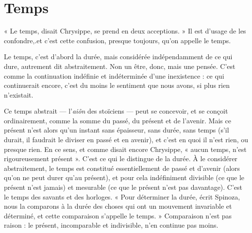 \section{Temps}
« Le temps, disait Chrysippe, se prend en deux acceptions. » Il est
d’usage de les confondre,.et c’est cette confusion, presque toujours,
qu’on appelle le temps.

Le temps, c’est d’abord la durée, mais considérée indépendamment de ce
qui dure, autrement dit abstraitement. Non un être, donc, mais une pensée.
C’est comme la continuation indéfinie et indéterminée d’une inexistence : ce
qui continuerait encore, c’est du moins le sentiment que nous avons, si plus
rien n'existait.

Ce temps abstrait — l’{\it aiôn} des stoïciens — peut se concevoir, et se conçoit
ordinairement, comme la somme du passé, du présent et de l’avenir. Mais ce
présent n’est alors qu’un instant sans épaisseur, sans durée, sans temps (s’il
durait, il faudrait le diviser en passé et en avenir), et c’est en quoi il n’est rien,
ou presque rien. En ce sens, et comme disait encore Chrysippe, « aucun temps,
n’est rigoureusement présent ». C’est ce qui le distingue de la durée. À le considérer
abstraitement, le temps est constitué essentiellement de passé et d’avenir
(alors qu’on ne peut durer qu’au présent), et pour cela indéfiniment divisible
(ce que le présent n’est jamais) et mesurable (ce que le présent n’est pas davantage).
C’est le temps des savants et des horloges. « Pour déterminer la durée,
écrit Spinoza, nous la comparons à la durée des choses qui ont un mouvement
invariable et déterminé, et cette comparaison s’appelle le temps. » Comparaison
n’est pas raison : le présent, incomparable et indivisible, n’en continue pas
moins.

